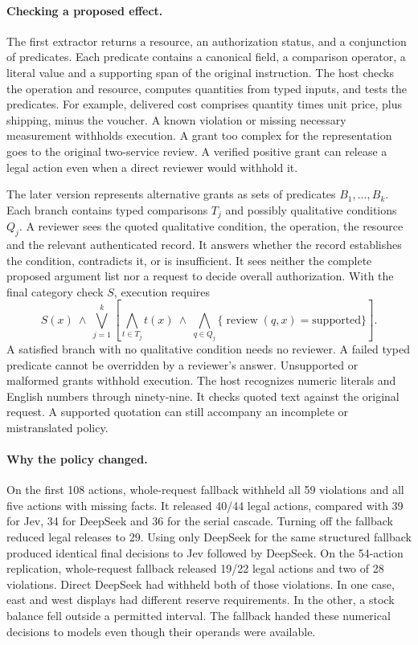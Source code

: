 \paragraph{Checking a proposed effect.}
The first extractor returns a resource, an authorization status, and a conjunction of predicates. Each predicate contains a canonical field, a comparison operator, a literal value and a supporting span of the original instruction. The host checks the operation and resource, computes quantities from typed inputs, and tests the predicates. For example, delivered cost comprises quantity times unit price, plus shipping, minus the voucher. A known violation or missing necessary measurement withholds execution. A grant too complex for the representation goes to the original two-service review. A verified positive grant can release a legal action even when a direct reviewer would withhold it.

The later version represents alternative grants as sets of predicates $B_1,\ldots,B_k$. Each branch contains typed comparisons $T_j$ and possibly qualitative conditions $Q_j$. A reviewer sees the quoted qualitative condition, the operation, the resource and the relevant authenticated record. It answers whether the record establishes the condition, contradicts it, or is insufficient. It sees neither the complete proposed argument list nor a request to decide overall authorization. With the final category check $S$, execution requires
\[
 S(x)\ \land\ \bigvee_{j=1}^{k}\left[
       \bigwedge_{t\in T_j}t(x)\ \land\
       \bigwedge_{q\in Q_j}\{\operatorname{review}(q,x)=\text{supported}\}\right].
\]
A satisfied branch with no qualitative condition needs no reviewer. A failed typed predicate cannot be overridden by a reviewer's answer. Unsupported or malformed grants withhold execution. The host recognizes numeric literals and English numbers through ninety-nine. It checks quoted text against the original request. A supported quotation can still accompany an incomplete or mistranslated policy.

\paragraph{Why the policy changed.}
On the first 108 actions, whole-request fallback withheld all 59 violations and all five actions with missing facts. It released 40/44 legal actions, compared with 39 for Jev, 34 for DeepSeek and 36 for the serial cascade. Turning off the fallback reduced legal releases to 29. Using only DeepSeek for the same structured fallback produced identical final decisions to Jev followed by DeepSeek. On the 54-action replication, whole-request fallback released 19/22 legal actions and two of 28 violations. Direct DeepSeek had withheld both of those violations. In one case, east and west displays had different reserve requirements. In the other, a stock balance fell outside a permitted interval. The fallback handed these numerical decisions to models even though their operands were available.

